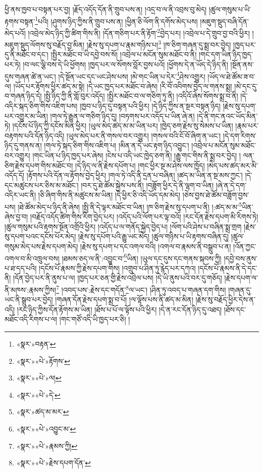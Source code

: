 ཕྱི་ནས་ཁྱབ་པ་བསྟན་པར་བྱ། །རྗོད་འདོད་དོན་ནི་གྲུབ་པས་ན། །འདྲ་བ་ལ་ནི་འབྲས་བུ་མེད། །ཚུལ་གསུམ་པ་ཡི་རྟགས་བསྟན་\footnote{«སྣར་»བརྟན་}པའི། །ཤུགས་ཉིད་ཀྱིས་ནི་གྲུབ་པས་ན། །ཕྱིན་ཅི་ལོག་ནི་དགོས་མེད་པས། །མཇུག་སྡུད་བཞི་དོན་མེད་པའོ། །འབྲེལ་མེད་ཉིད་ཀྱི་ཚིག་གིས་ནི། །དོན་གཅིག་པར་ནི་རྟོག་\footnote{«སྣར་»«པེ་»རྟོགས་}བྱེད་པར། །འབྲེལ་པ་དེ་གྲུབ་བྱ་བའི་ཕྱིར། །མཇུག་སྡུད་ལོགས་སུ་བརྗོད་བྱ་མིན། །རྗེས་སུ་དཔག་པ་རྣམ་གཉིས་པ།\footnote{«སྣར་»«པེ་»ལ།} །ཁ་ཅིག་གཞན་དུ་སྨྲ་བར་བྱེད། །ཁྱད་པར་དུ་ནི་མཐོང་བ་དང་། །སྤྱིར་མཐོང་བ་ཡི་དབྱེ་བས་སོ། །འབྲེལ་པ་མངོན་སུམ་མཐོང་བ་ནི། །གང་དག་ཡིན་ཉིད་ཁྱད་པར་ཏེ། །བ་ལང་ལྕི་བས་དེ་ཡི་ཕྱོགས། །ཁྱད་པར་ལ་སོགས་བློར་བྱས་པའོ། །ཕྱོགས་དེ་ན་ཡོད་དེ་ཉིད་ནི། །སྔོན་ནས་དུས་གཞན་ཚེ་ན་ཡང་། །དེ་སྔོན་ཡང་དང་ཡང་ཤེས་པས། །མེ་གང་ཡིན་པ་དེར་\footnote{«སྣར་»«པེ་»དེ་}ཤེས་འགྱུར། །ཡོད་ལ་ཐེ་ཚོམ་ཟ་བ་ལ། །ཡོད་པར་རྟོགས་ཕྱིར་ཚད་མ་སྟེ། །དེ་ཡང་ཁྱད་པར་མཐོང་བ་ཞེས། །རི་བོ་འབིགས་བྱེད་ལ་གནས་སྨྲ། །མེ་དང་དུ་བ་གཞན་ཉིད་དེ། །སྤྱི་ཉིད་ཀྱི་ནི་གློ་བུར་འདོད། །སྤྱིར་མཐོང་བ་ལ་གཅིག་ཏུ་ནི། །འདིའོ་ཞེས་སོགས་སྨྲ་བ་ནི། །དེ་འདིར་སྐད་ཅིག་གིས་འཇིག་པས། །ཁྱབ་པ་ཉིད་དུ་བསྟན་པའི་ཕྱིར། །དེ་ཉིད་ཀྱིས་ན་སྔར་བསྟན་ཉིད། །རྗེས་སུ་དཔག་པར་འགྱུར་མ་ཡིན། །གལ་ཏེ་རྒྱུན་ལ་གཅིག་ཉིད་དུ། །བཏགས་པར་འདོད་པ་ཡིན་ཞེ་ན། །དེ་ནི་གང་ནའང་ཡོད་མིན་ཏེ། །དངོས་པོ་ཉིད་ཀྱི་དངོས་མིན་ཕྱིར། །ཡུལ་མེད་ཚད་མ་མ་ཡིན་པར། །ཁྱེད་ཅག་རྗེས་སུ་སེམས་པ་ཡིན། །རྣམ་པར་བརྟགས་པའི་དོན་ཉིད་འདི། །ཡུལ་མེད་པར་ནི་གསལ་བར་འགྱུར། །གསལ་བའི་ངོ་བོ་ཞིག་ན་ཡང་། །དེ་དག་རིགས་ཉིད་དུ་གནས་ན། །གལ་ཏེ་སྐད་ཅིག་གིས་འཇིག་པ། །མིན་ན་དེ་ཡང་རྟག་ཉིད་འབྱུང་། །འབྲེལ་པ་མངོན་སུམ་མཐོང་བར་འགྱུར། །གང་ཡིན་པ་ཉིད་ཁྱད་པར་ཞེས། །ངེས་པ་འདི་ཡང་ཁྱེད་ཅག་ནི། །རྒྱུ་གང་གིས་ནི་སྨྲ་བར་བྱེད། །
ལན་ཅིག་རྗེས་དཔག་གིས་མཐོང་བ། །དེ་ཉིད་ལ་ནི་རྗེས་དཔོག་པ། །གང་ཕྱིར་སྔ་མ་ཤེས་ལས་ཁྱོད། །མེད་པས་ཚད་མར་མི་འདོད་དོ། །རྟོགས་པའི་དོན་ལ་རྟོགས་བྱེད་ཕྱིར། །གལ་ཏེ་འདི་ནི་དྲན་པ་བཞིན། །ཚད་མ་ཡིན་ན་སྔ་མས་ཀྱང་། །དེ་དང་མཚུངས་པར་ཅིས་མ་མཐོང་། །བར་དུ་ཐེ་ཚོམ་སྐྱེས་པས་ནི། །བཟློག་ཕྱིར་དེ་ནི་ལྷག་བ་ཡིན། །ཞེ་ན་དེ་དག་འདིར་ཡང་ནི། །ཅི་ཞིག་གིས་ནི་མཚུངས་མ་ཡིན། །དེ་ཕྱིར་ཅི་འདི་ཡོད་དམ་མེད། །ཅེས་བྱས་ཐེ་ཚོམ་བཟློག་བྱས་པས། །ཐེ་ཚོམ་མེད་པ་ཉིད་ནི་ཞེས། །སྤྱི་ནི་དེ་ལྟར་མཐོང་བ་ཡིན། །ཁ་ཅིག་རྗེས་སུ་དཔག་པ་ནི། །:ཚད་མ་མ་\footnote{«སྣར་»ཚད་མ་མར་}ཡིན་ཞེས་བྱ་བ། །བརྗོད་འདོད་ཚིག་གིས་རིག་བྱེད་པར། །འདོད་པའི་ལོག་པར་ལྟ་བའོ། །རང་དོན་རྗེས་དཔག་མི་རིགས་ཏེ། །ཚུལ་གསུམ་པའི་རྟགས་སྔོན་འགྲོའི་ཕྱིར། །འདོད་པ་ལ་གནོད་སྐྱེད་བྱེད་པ། །ལོག་པའི་ཤེས་པ་བཞིན་སྨྲ་གྲག །རྗེས་སུ་དཔག་པའང་དངོས་པོར་མེད། །རྗེས་སུ་དཔོག་པའི་རྒྱུ་ཡང་མེད། །ཚུལ་གཉིས་པ་ཡི་རྟགས་བཞིན་དུ། །ཚུལ་གསུམ་མེད་པས་རྗེས་དཔག་མེད། །རྗེས་སུ་དཔག་པ་དང་འགལ་བའི། །འགལ་བ་རྣམས་ནི་བསྒྲུབ་པ་ན། །འོན་ཀྱང་འགལ་བ་མི་འཁྲུལ་བས། །ཐམས་ཅད་ལ་ནི་:འབྱུང་བ་\footnote{«སྣར་»«པེ་»འབྱུང་མ་}ཡིན། །ཡུལ་དང་དུས་དང་གནས་སྐབས་ཀྱི། །དབྱེ་བས་ནུས་པ་ཐ་དད་པའི། །དངོས་པོ་རྣམས་ཀྱི་རྗེས་དཔག་གིས། །འགྲུབ་པ་ཤིན་ཏུ་རྙེད་པར་དཀའ། །དངོས་པོ་རྣམས་ནི་དེ་དང་ནི། །དོན་བྱེད་པར་ནི་ནུས་པ་ལ། །ཁྱད་པར་ཅན་གྱི་རྗེས་འབྲེལ་པས། །དེ་ཡི་ནུས་པའི་བར་དུ་གཅོད། །རྗེས་དཔག་ལ་ནི་མཁས་:རྣམས་ཀྱིས།\footnote{«སྣར་»«པེ་»རྣམས་ཀྱི།} །འབད་པས་:རྗེས་དང་གདོན་\footnote{«སྣར་»«པེ་»རྗེས་དཔག་དོན་}ལ་ཡང་། །ཤིན་ཏུ་འབད་པ་གཞན་དག་གིས། །གཞན་དུ་ཡང་ནི་སྒྲུབ་པར་བྱེད། །གཞན་དོན་རྗེས་དཔག་སྨྲ་བ་པོ། །ལ་ལྟོས་པས་ནི་ཚད་མ་མིན། །རྗེས་སུ་བརྗོད་ཕྱིར་དེས་ན་འདི། །རང་ཉིད་ཀྱིས་དོན་རྟོགས་མ་ཡིན། །ཐོས་པ་པོ་ལ་ལྟོས་པའི་ཕྱིར། །དེ་ན་རང་དོན་ཉིད་དུ་འཐད། །ཐོས་དང་མཐོང་འདི་རིགས་པ་ལ། །གང་གཙོ་འདི་ཡི་ཁྱད་པར་ཅི། །
